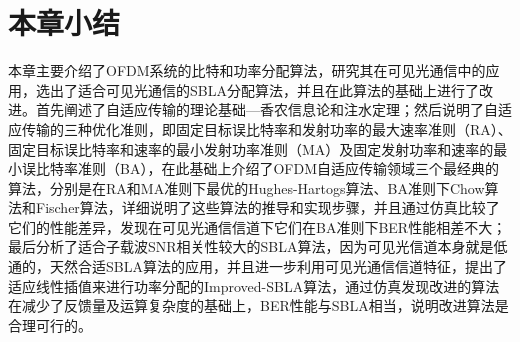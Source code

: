 \section{本章小结}
本章主要介绍了OFDM系统的比特和功率分配算法，研究其在可见光通信中的应用，选出了适合可见光通信的SBLA分配算法，并且在此算法的基础上进行了改进。首先阐述了自适应传输的理论基础—香农信息论和注水定理；然后说明了自适应传输的三种优化准则，即固定目标误比特率和发射功率的最大速率准则（RA）、固定目标误比特率和速率的最小发射功率准则（MA）及固定发射功率和速率的最小误比特率准则（BA），在此基础上介绍了OFDM自适应传输领域三个最经典的算法，分别是在RA和MA准则下最优的Hughes-Hartogs算法、BA准则下Chow算法和Fischer算法，详细说明了这些算法的推导和实现步骤，并且通过仿真比较了它们的性能差异，发现在可见光通信信道下它们在BA准则下BER性能相差不大；最后分析了适合子载波SNR相关性较大的SBLA算法，因为可见光信道本身就是低通的，天然合适SBLA算法的应用，并且进一步利用可见光通信信道特征，提出了适应线性插值来进行功率分配的Improved-SBLA算法，通过仿真发现改进的算法在减少了反馈量及运算复杂度的基础上，BER性能与SBLA相当，说明改进算法是合理可行的。
